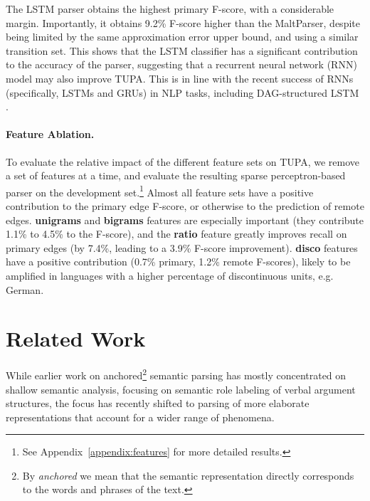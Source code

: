 \documentclass[11pt,a4paper]{article}
\newcommand{\parser}[1]{TUPA\textsubscript{#1}}
\begin{document}
The LSTM parser obtains the highest primary F-score,
with a considerable margin. Importantly, it obtains 9.2\% F-score
higher than the MaltParser,
despite being limited by the same approximation error upper bound,
and using a similar transition set.
This shows that the LSTM classifier has a significant contribution
to the accuracy of
the parser, suggesting that a recurrent neural network (RNN) model
may also improve \parser{}.
This is in line with the recent success of RNNs
(specifically, LSTMs and GRUs) in NLP tasks, including DAG-structured LSTM
\cite{zhu-sobhani-guo:2016:N16-1}.

\paragraph{Feature Ablation.}
To evaluate the relative impact of the different feature sets on \parser{},
we remove a set of features at a time, and evaluate the
resulting sparse perceptron-based parser on the development set.\footnote{See
Appendix~\ref{appendix:features} for more detailed results.}
Almost all feature sets have a positive contribution to the primary
edge F-score, or otherwise to the prediction of remote edges.
\textbf{unigrams} and \textbf{bigrams} features are especially
important (they contribute 1.1\% to 4.5\% to the F-score),
and the \textbf{ratio} feature greatly improves recall on
primary edges (by 7.4\%, leading to  a 3.9\% F-score improvement).
\textbf{disco} features have a positive contribution
(0.7\% primary, 1.2\% remote F-scores),
likely to be amplified in languages with a higher percentage of
discontinuous units, e.g. German.




\section{Related Work}\label{sec:related_work}

While earlier work on anchored\footnote{By {\it anchored} we mean that the semantic representation
  directly corresponds to the words and phrases of the text.} semantic parsing has mostly concentrated on shallow semantic analysis,
focusing on semantic role labeling of verbal argument structures,
the focus has recently shifted to parsing of more elaborate representations that account
for a wider range of phenomena.
\end{document}

